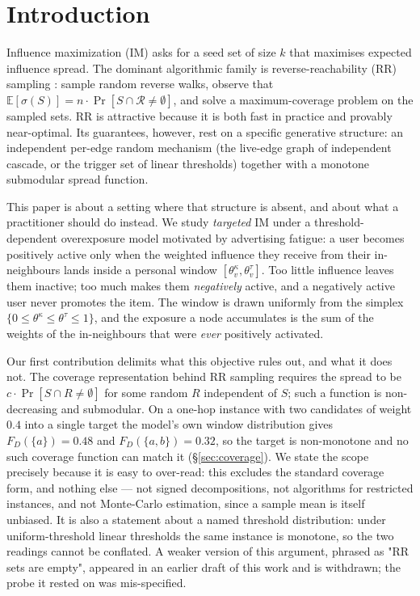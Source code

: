 \section{Introduction}
\label{sec:intro}

Influence maximization (IM) asks for a seed set of size $k$ that maximises expected influence
spread. The dominant algorithmic family is reverse-reachability (RR) sampling
\cite{borgs2014tim,tang2015imm,nguyen2016stop}: sample random reverse walks, observe that
$\mathbb{E}[\sigma(S)] = n \cdot \Pr[S \cap \mathcal{R} \neq \emptyset]$, and solve a
maximum-coverage problem on the sampled sets. RR is attractive because it is both fast in
practice and provably near-optimal. Its guarantees, however, rest on a specific generative
structure: an independent per-edge random mechanism (the live-edge graph of independent
cascade, or the trigger set of linear thresholds) together with a monotone submodular spread
function.

This paper is about a setting where that structure is absent, and about what a practitioner
should do instead. We study \emph{targeted} IM under a threshold-dependent overexposure model
\cite{zhu2026overexposure} motivated by advertising fatigue: a user becomes positively active
only when the weighted influence they receive from their in-neighbours lands inside a personal
window $[\theta^\kappa_v, \theta^\tau_v]$. Too little influence leaves them inactive; too much
makes them \emph{negatively} active, and a negatively active user never promotes the item.
The window is drawn uniformly from the simplex $\{0 \le \theta^\kappa \le \theta^\tau \le 1\}$,
and the exposure a node accumulates is the sum of the weights of the in-neighbours that were
\emph{ever} positively activated.

Our first contribution delimits what this objective rules out, and what it does not.  The
coverage representation behind RR sampling requires the spread to be $c \cdot \Pr[S \cap R \neq
\emptyset]$ for some random $R$ independent of $S$; such a function is non-decreasing and
submodular.  On a one-hop instance with two candidates of weight $0.4$ into a single target the
model's own window distribution gives $F_D(\{a\}) = 0.48$ and $F_D(\{a,b\}) = 0.32$, so the target
is non-monotone and no such coverage function can match it (\S\ref{sec:coverage}).  We state the
scope precisely because it is easy to over-read: this excludes the standard coverage form, and
nothing else --- not signed decompositions, not algorithms for restricted instances, and not
Monte-Carlo estimation, since a sample mean is itself unbiased.  It is also a statement about a
named threshold distribution: under uniform-threshold linear thresholds the same instance is
monotone, so the two readings cannot be conflated.  A weaker version of this argument, phrased as
"RR sets are empty", appeared in an earlier draft of this work and is withdrawn; the probe it
rested on was mis-specified.

